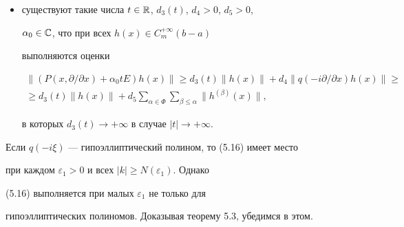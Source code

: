\begin{thms}
\begin{itemize}
$k\in\Bbb Z^n$, выполняются оценки 


\begin{equation} 


\bigg|\bigg(\alpha_0t E+\sum_{\alpha\in\Phi}C_\alpha(x) 


\bigg(\frac{2\pi i k}{b-a}\bigg)^\alpha\bigg)z\bigg|^2\ge 


|z|^2(d_1(t)+d_2|q(k)|^2), 


\end{equation} 


в которых $d_1(t)\to+\infty$, если $|t|\to+\infty;$ 


\item[2.] 


существуют такие числа $t\in\Bbb R$, $d_3(t)$, $d_4>0$, $d_5>0$, 


$\alpha_0\in\Bbb C$, что при всех $h(x)\in C^{+\infty}_m(b-a)$ 


выполняются оценки 


\begin{multline} 


\|(P(x,\partial/\partial x)+\alpha_0t E)h(x)\|\ge d_3(t) 


\|h(x)\|+d_4\|q(-i\partial/\partial x)h(x)\|\ge \\ 


% 


\ge d_3(t)\|h(x)\|+d_5\sum_{\alpha\in\Phi} 


\sum_{\beta\le\alpha}\|h^{(\beta)}(x)\|, 


\end{multline} 


в которых $d_3(t)\to+\infty$ в случае $|t|\to+\infty$. 


\end{itemize} 


\end{thms} 


 


 


\begin{notes} 


Если $q(-i\xi)$ --- гипоэллиптический полином, то (5.16) имеет место 


при каждом $\varepsilon_1>0$ и всех $|k|\ge N(\varepsilon_1)$. Однако 


(5.16) выполняется при малых $\varepsilon_1$ не только для 


гипоэллиптических полиномов. Доказывая теорему 5.3, убедимся в этом. 


\end{notes} 


